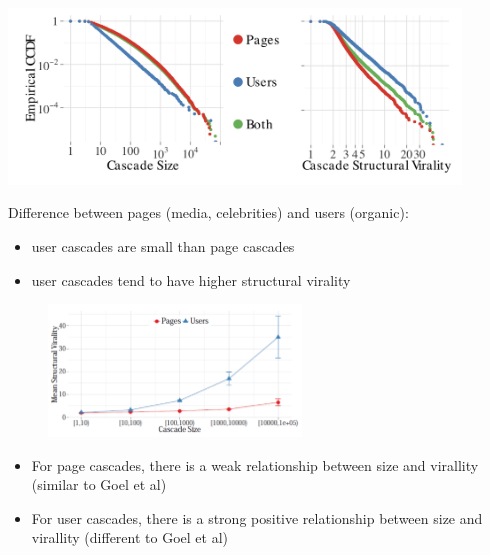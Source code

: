 \documentclass[aspectratio=169]{beamer}
\begin{document}
\begin{frame}

\begin{center}
  \includegraphics[width=0.9\textwidth]{figures/cheng_cascades_2014_fig2}
\end{center}

Difference between pages (media, celebrities) and users (organic):
\begin{itemize}
\item user cascades are small than page cascades \pause
\item user cascades tend to have higher structural virality
\end{itemize}


\end{frame}
\begin{frame}

\begin{figure}
  \centering
  \includegraphics[width=0.6\textwidth]{figures/cheng_cascades_2014_fig8_nocaption}
\end{figure}

\pause


\pause
\begin{itemize}
\item For page cascades, there is a weak relationship between size and virallity (similar to Goel et al) \pause
\item For user cascades, there is a strong positive relationship between size and virallity (different to Goel et al)
\end{itemize}

\end{frame}
\end{document}
